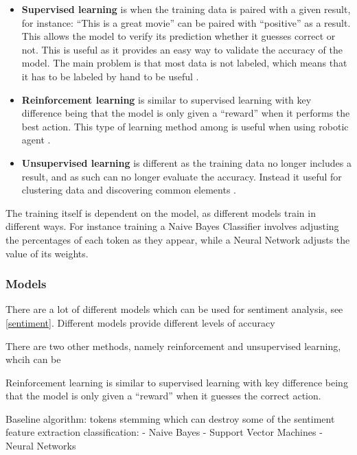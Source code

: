 \begin{itemize}
  \item \textbf{Supervised learning} is when the training data is paired with a
  given result, for instance: ``This is a great movie'' can be paired with
  ``positive'' as a result. This allows the model to verify its prediction
  whether it guesses correct or not. This is useful as it provides an easy way
  to validate the accuracy of the model. The main problem is that most data is
  not labeled, which means that it has to be labeled by hand to be
  useful \Source.
  \item \textbf{Reinforcement learning} is similar to supervised learning with
  key difference being that the model is only given a ``reward'' when it
  performs the best action. This type of learning method among is useful when
  using robotic agent \citep{Reinforcement}.
  \item \textbf{Unsupervised learning} is different as the training data no
  longer includes a result, and as such can no longer evaluate the accuracy.
  Instead it useful for clustering data and discovering common elements \Source.
\end{itemize}

The training itself is dependent on the model, as different models train in
different ways. For instance training a Naive Bayes Classifier involves
adjusting the percentages of each token as they appear, while a Neural Network
adjusts the value of its weights. 

\subsubsection{Models}

There are a lot of different models which can be used for sentiment analysis,
see \autoref{sentiment}. Different models provide different levels of accuracy




There are two other methods, namely reinforcement and unsupervised learning,
whcih can be 

Reinforcement learning is similar to supervised learning with key difference
being that the model is only given a ``reward'' when it guesses the correct
action. 




Baseline algorithm:
tokens
stemming which can destroy some of the sentiment
feature extraction
classification:
- Naive Bayes
- Support Vector Machines
- Neural Networks

